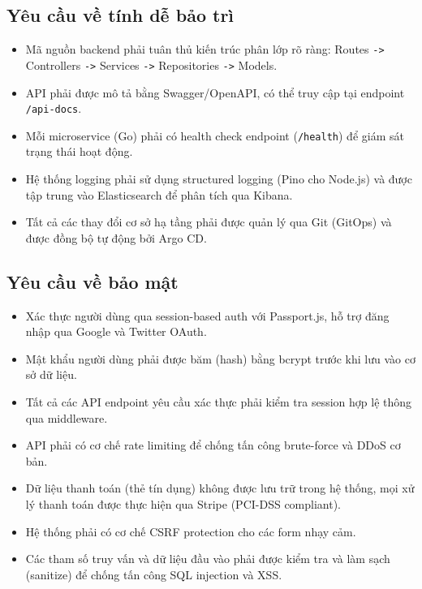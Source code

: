 \documentclass[13pt,a4paper,twoside]{report}
\begin{document}
\subsection{Yêu cầu về tính dễ bảo trì}

\begin{itemize}
  \item Mã nguồn backend phải tuân thủ kiến trúc phân lớp rõ ràng: Routes \texttt{->} Controllers \texttt{->} Services \texttt{->} Repositories \texttt{->} Models.
  \item API phải được mô tả bằng Swagger/OpenAPI, có thể truy cập tại endpoint \texttt{/api-docs}.
  \item Mỗi microservice (Go) phải có health check endpoint (\texttt{/health}) để giám sát trạng thái hoạt động.
  \item Hệ thống logging phải sử dụng structured logging (Pino cho Node.js) và được tập trung vào Elasticsearch để phân tích qua Kibana.
  \item Tất cả các thay đổi cơ sở hạ tầng phải được quản lý qua Git (GitOps) và được đồng bộ tự động bởi Argo CD.
\end{itemize}

\subsection{Yêu cầu về bảo mật}

\begin{itemize}
  \item Xác thực người dùng qua session-based auth với Passport.js, hỗ trợ đăng nhập qua Google và Twitter OAuth.
  \item Mật khẩu người dùng phải được băm (hash) bằng bcrypt trước khi lưu vào cơ sở dữ liệu.
  \item Tất cả các API endpoint yêu cầu xác thực phải kiểm tra session hợp lệ thông qua middleware.
  \item API phải có cơ chế rate limiting để chống tấn công brute-force và DDoS cơ bản.
  \item Dữ liệu thanh toán (thẻ tín dụng) không được lưu trữ trong hệ thống, mọi xử lý thanh toán được thực hiện qua Stripe (PCI-DSS compliant).
  \item Hệ thống phải có cơ chế CSRF protection cho các form nhạy cảm.
  \item Các tham số truy vấn và dữ liệu đầu vào phải được kiểm tra và làm sạch (sanitize) để chống tấn công SQL injection và XSS.
\end{itemize}
\end{document}
